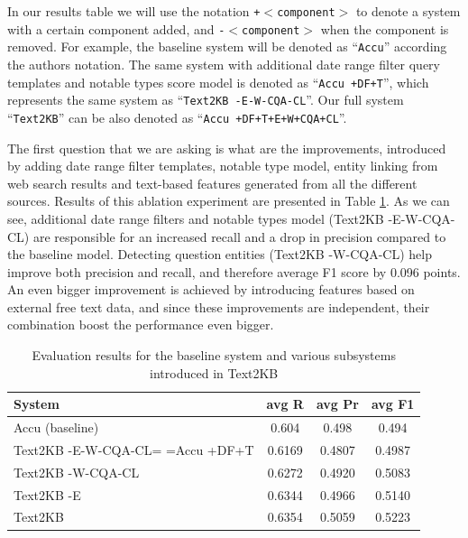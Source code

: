 In our results table we will use the notation \texttt{+$<$component$>$} to denote a system with a certain component added, and \texttt{-$<$component$>$} when the component is removed.
For example, the baseline system will be denoted as ``\texttt{Accu}'' according the authors notation.
The same system with additional date range filter query templates and notable types score model is denoted as ``\texttt{Accu +DF+T}'', which represents the same system as ``\texttt{Text2KB -E-W-CQA-CL}''.
Our full system ``\texttt{Text2KB}'' can be also denoted as ``\texttt{Accu +DF+T+E+W+CQA+CL}''.

The first question that we are asking is what are the improvements, introduced by adding date range filter templates, notable type model, entity linking from web search results and text-based features generated from all the different sources.
Results of this ablation experiment are presented in Table \ref{table:ablation:entities_vs_features}.
As we can see, additional date range filters and notable types model (Text2KB -E-W-CQA-CL) are responsible for an increased recall and a drop in precision compared to the baseline model.
Detecting question entities (Text2KB -W-CQA-CL) help improve both precision and recall, and therefore average F1 score by 0.096 points.
An even bigger improvement is achieved by introducing features based on external free text data, and since these improvements are independent, their combination boost the performance even bigger.

\begin{table}
\caption{Evaluation results for the baseline system and various subsystems introduced in Text2KB}
\label{table:ablation:entities_vs_features}
\begin{tabular}{| p{4.2cm} | c | c | c | }
\hline
System & avg R & avg Pr &  avg F1 \\
\hline
Accu (baseline) & 0.604 & 0.498 & 0.494\\
Text2KB -E-W-CQA-CL= =Accu +DF+T & 0.6169 & 0.4807 & 0.4987 \\
Text2KB -W-CQA-CL & 0.6272 & 0.4920 & 0.5083 \\  %
Text2KB -E & 0.6344 & 0.4966 & 0.5140 \\  %
\hline
Text2KB & 0.6354 & 0.5059 & 0.5223 \\
\hline
\end{tabular}
\end{table}


